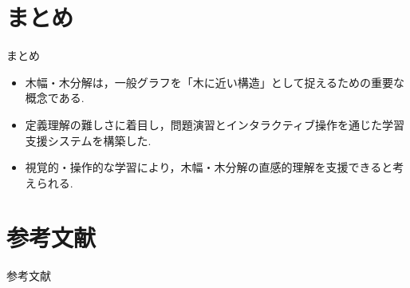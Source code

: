 \documentclass[aspectratio=169]{beamer}
\begin{document}
\section{まとめ}
\begin{frame}[label=sum]{まとめ}


\begin{itemize}
	\setlength{\leftskip}{-2em}
  \setlength{\parskip}{0.5em}
  \item 木幅・木分解は，一般グラフを「木に近い構造」として捉えるための重要な概念である.
  \item 定義理解の難しさに着目し，問題演習とインタラクティブ操作を通じた学習支援システムを構築した.
  \item 視覚的・操作的な学習により，木幅・木分解の直感的理解を支援できると考えられる.
\end{itemize}

\end{frame}
\section{参考文献}
\begin{frame}[allowframebreaks]{参考文献}
	\renewcommand{\bibsection}{} %
  \footnotesize
	
  
\end{frame}
\end{document}
